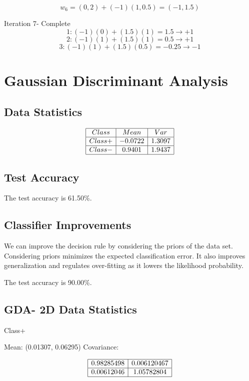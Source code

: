 \documentclass{article}
\begin{document}
\[w_6 = (0,2) + (-1)(1, 0.5) = (-1,1.5)\]

Iteration 7- Complete
\[1: (-1)(0) + (1.5)(1) = 1.5 \rightarrow +1\]
\[2: (-1)(1) + (1.5)(1) = 0.5 \rightarrow +1\]
\[3: (-1)(1) + (1.5)(0.5) = -0.25 \rightarrow -1\]

\section{Gaussian Discriminant Analysis}
\subsection{Data Statistics}

\[
\begin{array}{|c|c|c|}
\hline
Class & Mean & Var \\
\hline
Class + & -0.0722 & 1.3097 \\
\hline
Class - & 0.9401 & 1.9437 \\
\hline
\end{array}
\]

\subsection{Test Accuracy}
The test accuracy is 61.50\%.

\subsection{Classifier Improvements}
We can improve the decision rule by considering the priors of the data set. Considering priors minimizes the expected classification error. It also improves generalization and regulates over-fitting as it lowers the likelihood probability.

The test accuracy is 90.00\%.

\subsection{GDA- 2D Data Statistics}

Class+ 

Mean: (0.01307, 0.06295) 
Covariance:

\[
\begin{array}{|c|c|}
\hline
 0.98285498 & 0.006120467 \\
\hline
 0.00612046 & 1.05782804 \\
\hline
\end{array}
\]
\end{document}
